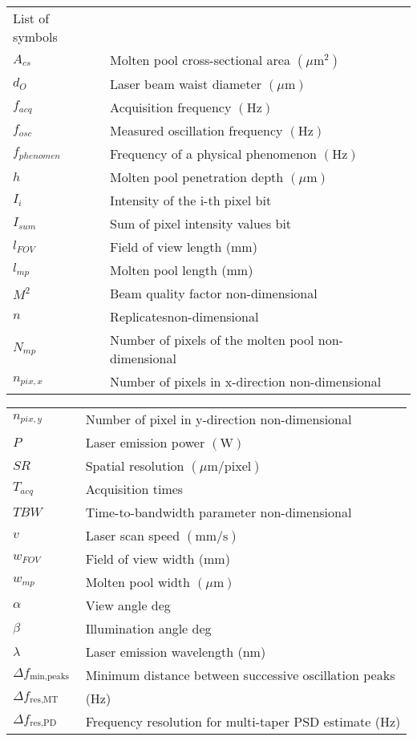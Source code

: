 \documentclass[10pt]{article}
\begin{document}
\begin{center}
\begin{tabular}{ll}
List of symbols &  \\
$A_{c s}$ & Molten pool cross-sectional area $\left(\mu \mathrm{m}^{2}\right)$ \\
$d_{O}$ & Laser beam waist diameter $(\mu \mathrm{m})$ \\
$f_{a c q}$ & Acquisition frequency $(\mathrm{Hz})$ \\
$f_{o s c}$ & Measured oscillation frequency $(\mathrm{Hz})$ \\
$f_{p h e n o m e n}$ & Frequency of a physical phenomenon $(\mathrm{Hz})$ \\
$h$ & Molten pool penetration depth $(\mu \mathrm{m})$ \\
$I_{i}$ & Intensity of the i-th pixel bit \\
$I_{s u m}$ & Sum of pixel intensity values bit \\
$l_{F O V}$ & Field of view length (mm) \\
$l_{m p}$ & Molten pool length (mm) \\
$M^{2}$ & Beam quality factor non-dimensional \\
$n$ & Replicatesnon-dimensional \\
$N_{m p}$ & Number of pixels of the molten pool non-dimensional \\
$n_{p i x, x}$ & Number of pixels in x-direction non-dimensional \\
\end{tabular}
\end{center}

\begin{center}
\begin{tabular}{ll}
$n_{p i x, y}$ & Number of pixel in y-direction non-dimensional \\
$P$ & Laser emission power $(\mathrm{W})$ \\
$S R$ & Spatial resolution $(\mu \mathrm{m} / \mathrm{pixel})$ \\
$T_{a c q}$ & Acquisition times \\
$T B W$ & Time-to-bandwidth parameter non-dimensional \\
$v$ & Laser scan speed $(\mathrm{mm} / \mathrm{s})$ \\
$w_{F O V}$ & Field of view width (mm) \\
$w_{m p}$ & Molten pool width $(\mu \mathrm{m})$ \\
$\alpha$ & View angle deg \\
$\beta$ & Illumination angle deg \\
$\lambda$ & Laser emission wavelength (nm) \\
$\Delta f_{\text {min,peaks }}$ & Minimum distance between successive oscillation peaks \\
$\Delta f_{\text {res,MT }}$ & (Hz) \\
$\Delta f_{\text {res,PD }}$ & Frequency resolution for multi-taper PSD estimate (Hz) \\
\end{tabular}
\end{center}
\end{document}
